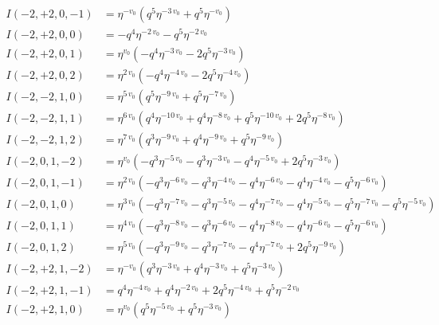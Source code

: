 \documentclass[11pt,a4paper]{article}
\begin{document}
\begin{align*}
I(-2, +2, 0, -1) &= \eta^{-v_{0}} \left( q^{5} \eta^{-3 \, v_{0}} + q^{5} \eta^{-v_{0}} \right) \\
I(-2, +2, 0, 0) &= -q^{4} \eta^{-2 \, v_{0}} - q^{5} \eta^{-2 \, v_{0}} \\
I(-2, +2, 0, 1) &= \eta^{v_{0}} \left( -q^{4} \eta^{-3 \, v_{0}} - 2 q^{5} \eta^{-3 \, v_{0}} \right) \\
I(-2, +2, 0, 2) &= \eta^{2 \, v_{0}} \left( -q^{4} \eta^{-4 \, v_{0}} - 2 q^{5} \eta^{-4 \, v_{0}} \right) \\
I(-2, -2, 1, 0) &= \eta^{5 \, v_{0}} \left( q^{5} \eta^{-9 \, v_{0}} + q^{5} \eta^{-7 \, v_{0}} \right) \\
I(-2, -2, 1, 1) &= \eta^{6 \, v_{0}} \left( q^{4} \eta^{-10 \, v_{0}} + q^{4} \eta^{-8 \, v_{0}} + q^{5} \eta^{-10 \, v_{0}} + 2 q^{5} \eta^{-8 \, v_{0}} \right) \\
I(-2, -2, 1, 2) &= \eta^{7 \, v_{0}} \left( q^{3} \eta^{-9 \, v_{0}} + q^{4} \eta^{-9 \, v_{0}} + q^{5} \eta^{-9 \, v_{0}} \right) \\
I(-2, 0, 1, -2) &= \eta^{v_{0}} \left( -q^{3} \eta^{-5 \, v_{0}} - q^{3} \eta^{-3 \, v_{0}} - q^{4} \eta^{-5 \, v_{0}} + 2 q^{5} \eta^{-3 \, v_{0}} \right) \\
I(-2, 0, 1, -1) &= \eta^{2 \, v_{0}} \left( -q^{3} \eta^{-6 \, v_{0}} - q^{3} \eta^{-4 \, v_{0}} - q^{4} \eta^{-6 \, v_{0}} - q^{4} \eta^{-4 \, v_{0}} - q^{5} \eta^{-6 \, v_{0}} \right) \\
I(-2, 0, 1, 0) &= \eta^{3 \, v_{0}} \left( -q^{3} \eta^{-7 \, v_{0}} - q^{3} \eta^{-5 \, v_{0}} - q^{4} \eta^{-7 \, v_{0}} - q^{4} \eta^{-5 \, v_{0}} - q^{5} \eta^{-7 \, v_{0}} - q^{5} \eta^{-5 \, v_{0}} \right) \\
I(-2, 0, 1, 1) &= \eta^{4 \, v_{0}} \left( -q^{3} \eta^{-8 \, v_{0}} - q^{3} \eta^{-6 \, v_{0}} - q^{4} \eta^{-8 \, v_{0}} - q^{4} \eta^{-6 \, v_{0}} - q^{5} \eta^{-6 \, v_{0}} \right) \\
I(-2, 0, 1, 2) &= \eta^{5 \, v_{0}} \left( -q^{3} \eta^{-9 \, v_{0}} - q^{3} \eta^{-7 \, v_{0}} - q^{4} \eta^{-7 \, v_{0}} + 2 q^{5} \eta^{-9 \, v_{0}} \right) \\
I(-2, +2, 1, -2) &= \eta^{-v_{0}} \left( q^{3} \eta^{-3 \, v_{0}} + q^{4} \eta^{-3 \, v_{0}} + q^{5} \eta^{-3 \, v_{0}} \right) \\
I(-2, +2, 1, -1) &= q^{4} \eta^{-4 \, v_{0}} + q^{4} \eta^{-2 \, v_{0}} + 2 q^{5} \eta^{-4 \, v_{0}} + q^{5} \eta^{-2 \, v_{0}} \\
I(-2, +2, 1, 0) &= \eta^{v_{0}} \left( q^{5} \eta^{-5 \, v_{0}} + q^{5} \eta^{-3 \, v_{0}} \right) \\

\end{align*}
\end{document}

